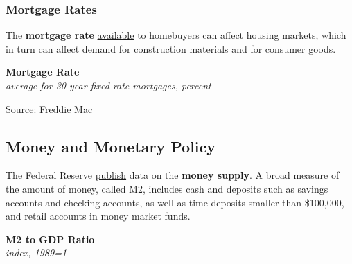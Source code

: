 \documentclass{report}
\makeatletter
\newcommand{\tbllink}[1]{\href{https://raw.githubusercontent.com/bdecon/US-chartbook/master/chartbook/data/#1}{\faTable}}
\newcommand*\short[1]{\expandafter\@gobbletwo\number\numexpr#1\relax}
\newcommand{\dateaxisticks}{
		date coordinates in=x, axis line style={draw=none},
		xmax={2023-11-01},
		max space between ticks=40,	    
		xtick={{1990-01-01}, {1992-01-01}, {1994-01-01}, 
			{1996-01-01}, {1998-01-01}, {2000-01-01}, 
			{2002-01-01}, {2004-01-01}, {2006-01-01},
			{2008-01-01}, {2010-01-01}, {2012-01-01}, {2014-01-01},
		    {2016-01-01}, {2018-01-01}, {2020-01-01}, {2022-01-01}, 
		    {2024-01-01}, {2026-01-01}},
		minor xtick={{1989-01-01}, {1991-01-01}, {1993-01-01},
			{1995-01-01}, {1997-01-01}, {1999-01-01}, 
			{2001-01-01}, {2003-01-01}, {2005-01-01}, {2007-01-01},
		    {2009-01-01}, {2011-01-01}, {2013-01-01}, {2015-01-01},
		    {2017-01-01}, {2019-01-01}, {2021-01-01}, {2023-01-01}, 
		    {2025-01-01}, {2027-01-01}},
		enlarge y limits={0.06}, enlarge x limits={0.01},
		}
\newcommand{\bbar}[2]{extra #1 ticks = {{#2}}, extra #1 tick labels = ,
		extra #1 tick style = {grid=major, grid style={thick, black!25}},}
\newcommand{\stdline}[4]{\addplot[very thick, no markers, color=#1] 
		table [x=#2, y=#3, col sep=comma] {#4};	}
\newcommand{\rbars}{
		\fill[color=black!10] (axis cs:{1990-07-01},\pgfkeysvalueof{/pgfplots/ymin}) rectangle 
			(axis cs:{1991-03-01}, \pgfkeysvalueof{/pgfplots/ymax});
		\fill[color=black!10] (axis cs:{2007-12-01},\pgfkeysvalueof{/pgfplots/ymin}) rectangle 
			(axis cs:{2009-07-01}, \pgfkeysvalueof{/pgfplots/ymax});
		\fill[color=black!10] (axis cs:{2001-03-01},\pgfkeysvalueof{/pgfplots/ymin}) rectangle 
			(axis cs:{2001-11-01}, \pgfkeysvalueof{/pgfplots/ymax});
		\fill[color=black!10] (axis cs:{2020-02-01},\pgfkeysvalueof{/pgfplots/ymin}) rectangle 
			(axis cs:{2020-05-01}, \pgfkeysvalueof{/pgfplots/ymax});}
\makeatother
\begin{document}
{\begin{minipage}{0.76\textwidth}
\subsubsection*{Mortgage Rates} 
\vspace{-0.5mm}

\small The \textbf{mortgage rate} \href{https://www.freddiemac.com/pmms/pmms30}{available} to homebuyers can affect housing markets, which in turn can affect demand for construction materials and for consumer goods.  
\vspace{0.5mm} 

\normalsize \textbf{Mortgage Rate}\\
\footnotesize{\textit{average for 30-year fixed rate mortgages, percent}}
\vspace{3.1cm}

\hspace{2mm} 

\footnotesize{Source: Freddie Mac} \hfill \tbllink{mortgage_mo.csv}
\end{minipage}
\newpage
\hypertarget{capmm}{\label{capmm}}
\begin{minipage}{0.76\textwidth}
\subsection*{Money and Monetary Policy}  
\small The Federal Reserve \href{https://www.federalreserve.gov/releases/h6/current/default.htm}{publish} data on the \textbf{money supply}. A broad measure of the amount of money, called M2, includes cash and deposits such as savings accounts and checking accounts, as well as time deposits smaller than \$100,000, and retail accounts in money market funds. 

\begin{minipage}{0.52\textwidth}

\end{minipage} \hfill \begin{minipage}{0.42\textwidth}
\normalsize \textbf{M2 to GDP Ratio}\\
\footnotesize{\textit{index, 1989=1}}
\vspace{2.0cm}


\end{minipage}
\end{minipage}}
\end{document}
